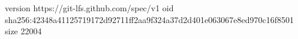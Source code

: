 version https://git-lfs.github.com/spec/v1
oid sha256:42348a41125719172d92711ff2aa9f324a37d2d401e063067e8ed970c16f8501
size 22004
